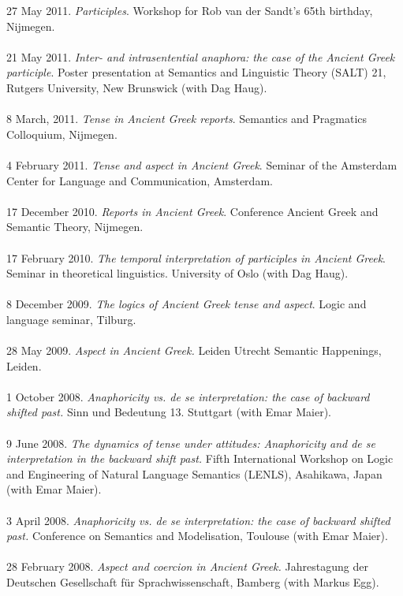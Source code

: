 \documentclass[a4paper,11pt]{article}
\begin{document}
27 May 2011. \emph{Participles}. Workshop for Rob van der Sandt's 65th birthday, Nijmegen.\\\\
21 May 2011. \emph{Inter- and intrasentential anaphora: the case of the Ancient Greek participle}. Poster presentation at Semantics and Linguistic Theory (SALT) 21, Rutgers University, New Brunswick (with Dag Haug).\\\\
8 March, 2011. \emph{Tense in Ancient Greek reports}. Semantics and Pragmatics Colloquium, Nijmegen.\\\\
4 February 2011. \emph{Tense and aspect in Ancient Greek}. Seminar of the Amsterdam Center for Language and Communication, Amsterdam.\\\\
17 December 2010. \emph{Reports in Ancient Greek}. Conference Ancient Greek and Semantic Theory, Nijmegen.\\\\ 
17 February 2010. \emph{The temporal interpretation of participles in Ancient Greek}.
Seminar in theoretical linguistics. University of Oslo (with Dag Haug).\\\\
8 December 2009. \emph{The logics of Ancient Greek tense and aspect}. Logic and language seminar, Tilburg.\\\\
28 May 2009. \emph{Aspect in Ancient Greek.} Leiden Utrecht Semantic Happenings, Leiden.\\\\
1 October 2008. \emph{Anaphoricity vs. de se interpretation: the case of backward shifted past.} Sinn und Bedeutung 13. Stuttgart (with Emar Maier).\\\\ 
9 June 2008. \emph{The dynamics of tense under attitudes: Anaphoricity and de se interpretation in the backward shift past.} Fifth International Workshop on Logic and Engineering of Natural Language Semantics (LENLS), Asahikawa, Japan (with Emar Maier).\\\\
3 April 2008. \emph{Anaphoricity vs. de se interpretation: the case of backward shifted past.} Conference on Semantics and Modelisation, Toulouse (with Emar Maier).\\\\
28 February 2008. \emph{Aspect and coercion in Ancient Greek.} Jahrestagung der Deutschen Gesellschaft f\"ur Sprachwissenschaft, Bamberg (with Markus Egg).\\\\
\end{document}
